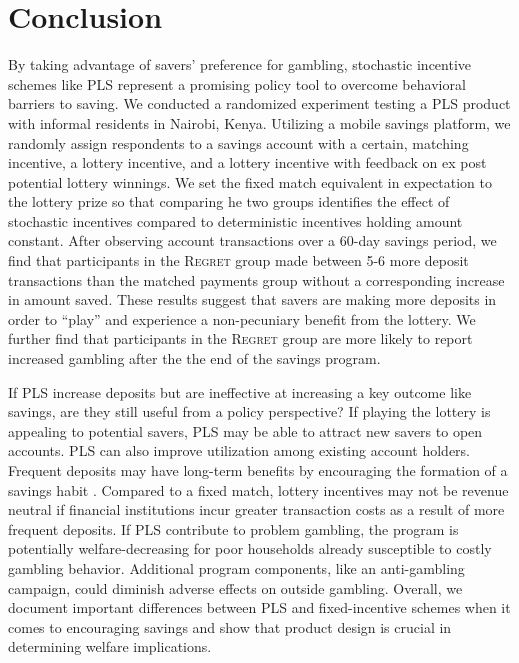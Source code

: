 \documentclass[11pt]{article}
\begin{document}
		

\section{Conclusion} \label{sec:conclusion}

		By taking advantage of savers' preference for gambling, stochastic incentive schemes like PLS represent a promising policy tool to overcome behavioral barriers to saving. We conducted a randomized experiment testing a PLS product with informal residents in Nairobi, Kenya. Utilizing a mobile savings platform, we randomly assign respondents to a savings account with a certain, matching incentive, a lottery incentive, and a lottery incentive with feedback on ex post potential lottery winnings. We set the fixed match equivalent in expectation to the lottery prize so that comparing he two groups identifies the effect of stochastic incentives compared to deterministic incentives holding amount constant. After observing account transactions over a 60-day savings period, we find that participants in the \textsc{Regret} group made between 5-6 more deposit transactions than the matched payments group without a corresponding increase in amount saved. These results suggest that savers are making more deposits in order to ``play'' and experience a non-pecuniary benefit from the lottery. We further find that participants in the \textsc{Regret} group are more likely to report increased gambling after the the end of the savings program.

		If PLS increase deposits but are ineffective at increasing a key outcome like savings, are they still useful from a policy perspective? If playing the lottery is appealing to potential savers, PLS may be able to attract new savers to open  accounts. PLS can also improve utilization among existing account holders. Frequent deposits may have long-term benefits by encouraging the formation of a savings habit . Compared to a fixed match, lottery incentives may not be revenue neutral if financial institutions incur greater transaction costs as a result of more frequent deposits. If PLS contribute to problem gambling, the program is potentially welfare-decreasing for poor households already susceptible to costly gambling behavior. Additional program components, like an anti-gambling campaign, could diminish adverse effects on outside gambling. Overall, we document important differences between PLS and fixed-incentive schemes when it comes to encouraging savings and show that product design is crucial in determining welfare implications.
\end{document}
